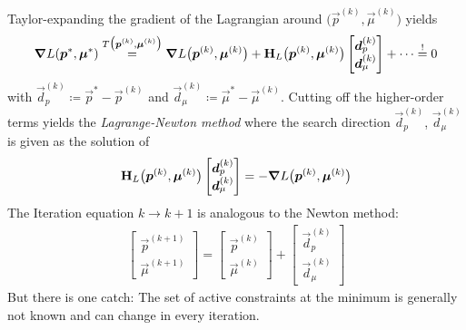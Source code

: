 		Taylor-expanding the gradient of the Lagrangian around \( \big( \vec{p}^{(k)}, \vec{\mu}^{(k)} \big) \) yields
		\begin{align*}
			\grad{L}(\bm{p}^\ast, \bm{\mu}^\ast) \overset{T\big(\bm{p}^{(k)}, \bm{\mu}^{(k)}\big)}{=} \grad{L}\big(\bm{p}^{(k)}, \bm{\mu}^{(k)}\big) + \bm{\mathrm{H}}_L\big(\bm{p}^{(k)}, \bm{\mu}^{(k)}\big) \begin{bmatrix} \bm{d}_p^{(k)} \\ \bm{d}_\mu^{(k)} \end{bmatrix} + \cdots \overset{!}{=} 0
		\end{align*}
		with \( \vec{d}_p^{(k)} \coloneqq \vec{p}^\ast - \vec{p}^{(k)} \) and \( \vec{d}_\mu^{(k)} \coloneqq \vec{\mu}^\ast - \vec{\mu}^{(k)} \). Cutting off the higher-order terms yields the \emph{Lagrange-Newton method} where the search direction \( \vec{d}_p^{(k)} \), \( \vec{d}_\mu^{(k)} \) is given as the solution of
		\begin{align}
			\bm{\mathrm{H}}_L\big(\bm{p}^{(k)}, \bm{\mu}^{(k)}\big) \begin{bmatrix} \bm{d}_p^{(k)} \\ \bm{d}_\mu^{(k)} \end{bmatrix} = -\grad{L}\big(\bm{p}^{(k)}, \bm{\mu}^{(k)}\big) \label{eq:sqpEqSystem}
		\end{align}
		The Iteration equation \( k \to k + 1 \) is analogous to the Newton method:
		\begin{align*}
			\begin{bmatrix}
				\vec{p}^{(k + 1)} \\
				\vec{\mu}^{(k + 1)}
			\end{bmatrix}
			=
			\begin{bmatrix}
				\vec{p}^{(k)} \\
				\vec{\mu}^{(k)}
			\end{bmatrix}
			+
			\begin{bmatrix}
				\vec{d}_p^{(k)} \\
				\vec{d}_\mu^{(k)}
			\end{bmatrix}
		\end{align*}
		But there is one catch: The set of active constraints at the minimum is generally not known and can change in every iteration.

